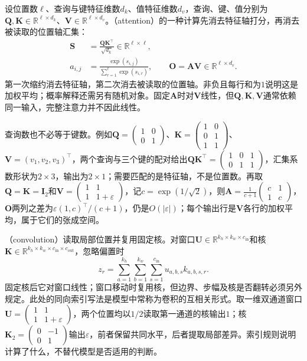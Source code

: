 设位置数$\ell$、查询与键特征维数$d_k$、值特征维数$d_v$，查询、键、值分别为$\bm Q,\bm K\in\mathbb R^{\ell\times d_k}$、$\bm V\in\mathbb R^{\ell\times d_v}$。（attention）的一种计算先消去特征轴打分，再消去被读取的位置轴汇集：
\begin{align}
 \bm S&=\frac{\bm Q\bm K^\top}{\sqrt{d_k}}\in\mathbb R^{\ell\times\ell},
 \label{eq:linear-algebra-attention-scores}\\
 a_{i,j}&=\frac{\exp(s_{i,j})}{\sum_{r=1}^{\ell}\exp(s_{i,r})},
 \qquad
 \bm O=\bm A\bm V\in\mathbb R^{\ell\times d_v}.
 \label{eq:linear-algebra-attention-contraction}
\end{align}
第一次缩约消去特征轴，第二次消去被读取的位置轴。非负且每行和为$1$说明这是加权平均；概率解释还需另有随机对象。固定$\bm A$时对$\bm V$线性，但$\bm Q,\bm K,\bm V$通常依赖同一输入，完整注意力并不因此线性。

查询数也不必等于键数。例如$\bm Q=\begin{pmatrix}1&0\\0&1\end{pmatrix}$、$\bm K=\begin{pmatrix}1&0\\0&1\\1&1\end{pmatrix}$、$\bm V=(v_1,v_2,v_3)^\top$，两个查询与三个键的配对给出$\bm Q\bm K^\top=\begin{pmatrix}1&0&1\\0&1&1\end{pmatrix}$，汇集系数形状为$2\times3$，输出为$2\times1$；需要匹配的是特征轴，不是位置数。再取$\bm Q=\bm K=\bm I_2$和$\bm V=\begin{pmatrix}1&1\\1&1+\varepsilon\end{pmatrix}$，记$c=\exp(1/\sqrt2)$，则$\bm A=\frac1{c+1}\begin{pmatrix}c&1\\1&c\end{pmatrix}$，$\bm O$两列之差为$\varepsilon(1,c)^\top/(c+1)$，仍是$O(|\varepsilon|)$；每个输出行是$\bm V$各行的加权平均，属于它们的张成空间。

（convolution）读取局部位置并复用固定核。对窗口$\bm U\in\mathbb R^{k_h\times k_w\times c_{\mathrm{in}}}$和核$\bm K\in\mathbb R^{k_h\times k_w\times c_{\mathrm{in}}\times c_{\mathrm{out}}}$，忽略偏置时
\begin{equation}
 z_r=\sum_{a=1}^{k_h}\sum_{b=1}^{k_w}\sum_{s=1}^{c_{\mathrm{in}}}
 u_{a,b,s}k_{a,b,s,r}.
 \label{eq:linear-algebra-convolution-window-contraction}
\end{equation}
固定核后它对窗口线性；窗口移动时复用核，但边界、步幅及核是否翻转必须另外规定。此处的同向索引写法是模型中常称为卷积的互相关形式。取一维双通道窗口$\bm U=\begin{pmatrix}1&1\\1&1+\varepsilon\end{pmatrix}$，两个位置均以$1/2$读取第一通道的核输出$1$；核$\bm K_2=\begin{pmatrix}0&-1\\0&1\end{pmatrix}$输出$\varepsilon$，前者保留共同水平，后者提取局部差异。索引规则说明计算了什么，不替代模型是否适用的判断。

